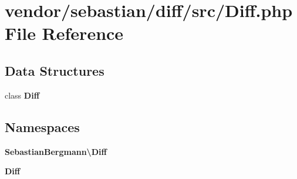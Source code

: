 \section{vendor/sebastian/diff/src/\+Diff.php File Reference}
\label{sebastian_2diff_2src_2_diff_8php}
\subsection*{Data Structures}
\begin{DoxyCompactItemize}
\item 
class {\bf Diff}
\end{DoxyCompactItemize}
\subsection*{Namespaces}
\begin{DoxyCompactItemize}
\item 
 {\bf Sebastian\+Bergmann\textbackslash{}\+Diff}
\item 
 {\bf Diff}
\end{DoxyCompactItemize}
